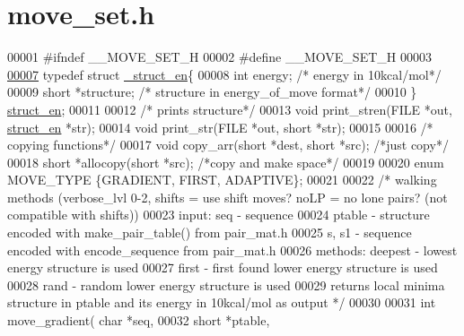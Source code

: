\hypertarget{move__set_8h_source}{}\section{move\+\_\+set.\+h}
\label{move__set_8h_source}

\begin{DoxyCode}
00001 \textcolor{preprocessor}{#ifndef \_\_MOVE\_SET\_H}
00002 \textcolor{preprocessor}{#define \_\_MOVE\_SET\_H}
00003 
\hyperlink{struct__struct__en}{00007} \textcolor{keyword}{typedef} \textcolor{keyword}{struct }\hyperlink{struct__struct__en}{\_struct\_en}\{
00008   \textcolor{keywordtype}{int} energy;        \textcolor{comment}{/* energy in 10kcal/mol*/}
00009   \textcolor{keywordtype}{short} *structure;  \textcolor{comment}{/* structure in energy\_of\_move format*/}
00010 \} \hyperlink{struct__struct__en}{struct\_en};
00011 
00012 \textcolor{comment}{/* prints structure*/}
00013 \textcolor{keywordtype}{void} print\_stren(FILE *out, \hyperlink{struct__struct__en}{struct\_en} *str);
00014 \textcolor{keywordtype}{void} print\_str(FILE *out, \textcolor{keywordtype}{short} *str);
00015 
00016 \textcolor{comment}{/* copying functions*/}
00017 \textcolor{keywordtype}{void} copy\_arr(\textcolor{keywordtype}{short} *dest, \textcolor{keywordtype}{short} *src); \textcolor{comment}{/*just copy*/}
00018 \textcolor{keywordtype}{short} *allocopy(\textcolor{keywordtype}{short} *src);            \textcolor{comment}{/*copy and make space*/}
00019 
00020 \textcolor{keyword}{enum} MOVE\_TYPE \{GRADIENT, FIRST, ADAPTIVE\};
00021 
00022 \textcolor{comment}{/* walking methods (verbose\_lvl 0-2, shifts = use shift moves? noLP = no lone pairs? (not compatible with
       shifts))}
00023 \textcolor{comment}{    input:    seq - sequence}
00024 \textcolor{comment}{              ptable - structure encoded with make\_pair\_table() from pair\_mat.h}
00025 \textcolor{comment}{              s, s1 - sequence encoded with encode\_sequence from pair\_mat.h}
00026 \textcolor{comment}{    methods:  deepest - lowest energy structure is used}
00027 \textcolor{comment}{              first - first found lower energy structure is used}
00028 \textcolor{comment}{              rand - random lower energy structure is used}
00029 \textcolor{comment}{    returns local minima structure in ptable and its energy in 10kcal/mol as output */}
00030 
00031 \textcolor{keywordtype}{int} move\_gradient( \textcolor{keywordtype}{char} *seq,
00032                   \textcolor{keywordtype}{short} *ptable,

\end{DoxyCode}
